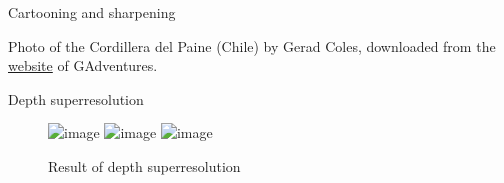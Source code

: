 \documentclass{beamer}
\begin{document}
\begin{frame}{Cartooning and sharpening}

{\small Photo of the Cordillera del Paine (Chile) by Gerad Coles, downloaded from the \textcolor{blue}{\href{https://www.gadventures.com/blog/12-of-our-planets-most-jaw-dropping-landscapes/}{website}} of GAdventures.}

\end{frame}

\begin{frame}{Depth superresolution}
    \begin{figure}
    \centering
    \includegraphics<1>[width=0.6\linewidth]{../code/results/depth_superresolution_room_ref.png}
    \includegraphics<1>[width=0.3\linewidth]{../code/results/depth_superresolution_room_target.png}
    \includegraphics<2>[width=0.7\linewidth]{../code/results/depth_superresolution_room_new.png}
    \caption{Result of depth superresolution}
\end{figure}
\end{frame}
\end{document}
